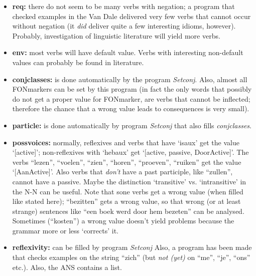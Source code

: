 \begin{itemize}
  \item {\bf req:} there do not seem to be many verbs with negation; a program 
        that checked examples in the Van Dale delivered  very few verbs that 
        cannot occur without negation (it {\em did} deliver quite a few 
        interesting idioms, however). Probably, investigation of linguistic 
        literature will yield more verbs.
         
  \item {\bf env:} most verbs will have default value. Verbs with interesting 
        non-default values can probably be found in literature.

  \item {\bf conjclasses:} is done automatically by the program {\em Setconj}.
         Also, almost all FONmarkers can be set by this program (in fact the 
         only words that possibly do not get a proper value for FONmarker, 
         are verbs that cannot be inflected; therefore the chance that a 
         wrong value leads to consequences is very small). 

  \item {\bf particle:} is done automatically by program {\em Setconj} that 
        also fills {\em conjclasses}.

  \item {\bf possvoices:} normally, reflexives and verbs that have `isaux' get 
        the value `[active]'; non-reflexives with `hebaux' get 
        `[active, passive, DoorActive]'. The verbs ``lezen'', ``voelen'', 
        ``zien'', ``horen'', ``proeven'', ``ruiken'' get the value 
        `[AanActive]'. Also verbs that {\em don't} have a past participle, 
        like ``zullen'', cannot have a passive. Maybe the distinction 
        `transitive' vs. `intransitive' in the N-N can be useful. 
        Note that sone verbs get a wrong value (when filled like stated here); 
        ``bezitten'' gets a wrong value, so that wrong (or at least strange) 
        sentences like ``een boek werd door hem bezeten'' 
        can be analysed. Sometimes (``kosten'') a wrong value doesn't yield 
        problems because the grammar more or less `corrects' it.

  \item {\bf reflexivity:} can be filled by program {\em Setconj} 
        Also, a program has been made that checks examples on the string 
        ``zich'' (but {\em not (yet)} on ``me'', ``je'', ``ons'' etc.). 
        Also, the ANS contains a list.


\end{itemize}
